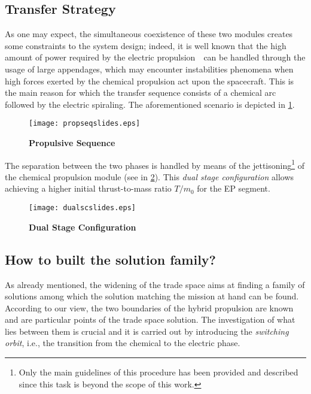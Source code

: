 \subsection{Transfer Strategy}
\label{subsec:transferstrategy}
As one may expect, the simultaneous coexistence of these two modules creates some constraints to the system design; indeed, it is well known that the high amount of power required by the electric propulsion~\cite{goebel2008fundamentals}~can be handled through the usage of large appendages, which may encounter instabilities phenomena when high forces exerted by the chemical propulsion act upon the spacecraft. This is the main reason for which the transfer sequence consists of a chemical arc followed by the electric spiraling. 
The aforementioned scenario is depicted in \figurename\ref{fig:propulsivesequence}.
%
\begin{figure}[htp]
\centering
\texttt{[image: propseqslides.eps]}
\caption{\textbf{Propulsive Sequence}}
\label{fig:propulsivesequence}
\end{figure}
%

The separation between the two phases 
is handled by means of the jettisoning\footnote{Only the main guidelines of this procedure has been provided and described since this task is beyond the scope of this work.} of the chemical propulsion module (see in \figurename\ref{fig:dualstageconfiguration}). This \emph{dual stage configuration} allows achieving a higher initial thrust-to-mass ratio $T/m_0$ for the EP segment.
%
\begin{figure}[htp]
\centering
\texttt{[image: dualscslides.eps]}
\caption{\textbf{Dual Stage Configuration}}
\label{fig:dualstageconfiguration}
\end{figure}
%
\subsection{How to built the solution family?}
\label{subsubsec:howtobuiltthesolutionfamily}

As already mentioned, the widening of the trade space aims at finding a family of solutions among which the solution matching the mission at hand can be found. According to our view, the two boundaries of the hybrid propulsion are known and are particular points of the trade space solution. 
The investigation of what lies between them is crucial and it is carried out by introducing the \emph{switching orbit}, i.e., the transition from the chemical to the electric phase.


